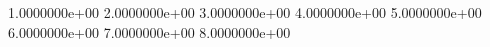    1.0000000e+00   2.0000000e+00   3.0000000e+00   4.0000000e+00
   5.0000000e+00   6.0000000e+00   7.0000000e+00   8.0000000e+00
